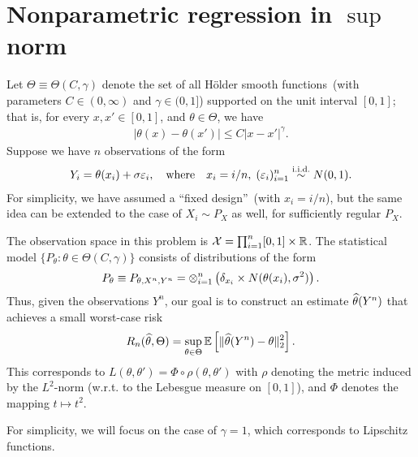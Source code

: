 \documentclass[12pt]{article}
\begin{document}
\section{Nonparametric regression in $\sup$ norm}
\label{sec:fano-nonparametric-regression}


Let $\Theta \equiv \Theta(C, \gamma)$ denote the set of all H\"older smooth functions~(with  parameters $C \in (0, \infty)$ and $\gamma \in (0, 1]$)  supported on the unit interval $[0,1]$; that is, for every $x, x' \in [0,1]$, and $\theta \in \Theta$, we have 
\begin{align}
|\theta(x)-\theta(x')| \leq C |x-x'|^\gamma.
\end{align}
Suppose we have $n$ observations of the form 
\begin{align}
	Y_i = \theta(x_i) + \sigma \varepsilon_i, \quad \text{where} \quad x_i = i/n, \; (\varepsilon_i)_{i=1}^n \stackrel{\text{i.i.d.}}{\sim} N(0, 1). 
\end{align}
For simplicity, we have assumed a ``fixed design''~(with $x_i = i/n$), but the same idea can be extended to the case of $X_i \sim P_X$ as well, for sufficiently regular $P_X$. 


The observation space in this problem is ${\cal X} = \prod_{i=1}^n [0,1] \times \mathbb{R}$. The statistical model $\{P_\theta: \theta \in \Theta(C, \gamma)\}$ consists of distributions of the form 
\begin{align}
	P_\theta \equiv P_{\theta, X^n, Y^n} = \otimes_{i=1}^n \left( \delta_{x_i} \times N(\theta(x_i), \sigma^2) \right). 
\end{align}
Thus, given the observations $Y^n$, our goal is to construct an estimate $\widehat{\theta}(Y^n)$ that achieves a small worst-case risk 
\begin{align}
R_n(\widehat{\theta}, \Theta) = \sup_{\theta \in \Theta} \mathbb{E}\left[ \|\widehat{\theta}(Y^n) - \theta\|_2^2 \right]. 
\end{align}
This corresponds to $L(\theta, \theta') = \Phi \circ \rho(\theta, \theta')$ with $\rho$ denoting the metric induced by the $L^2$-norm (w.r.t. to the Lebesgue measure on $[0,1]$), and $\Phi$ denotes the mapping $t \mapsto t^2$.  

For simplicity, we will focus on the case of $\gamma=1$, which corresponds to Lipschitz functions. 
\end{document}
